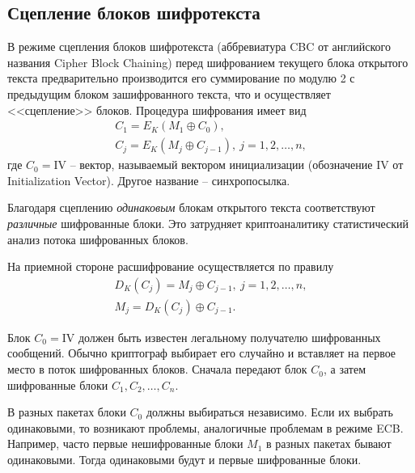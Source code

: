 

\subsection{Сцепление блоков шифротекста}

В режиме сцепления блоков шифротекста (аббревиатура CBC от английского названия Cipher Block Chaining) перед шифрованием текущего блока открытого текста предварительно производится его суммирование по модулю 2 с предыдущим блоком зашифрованного текста, что и осуществляет <<сцепление>> блоков. Процедура шифрования имеет вид
\[ \begin{array}{l}
    C_1 = E_K(M_1 \oplus C_0), \\
    C_j = E_K(M_j \oplus C_{j-1}), ~ j = 1, 2, \dots,  n,
\end{array} \]
где $C_0 = \textrm{IV}$ --  вектор, называемый вектором инициализации (обозначение $\textrm{IV}$ от Initialization Vector). Другое название -- синхропосылка.

Благодаря сцеплению \emph{одинаковым} блокам открытого текста соответствуют \emph{различные} шифрованные блоки. Это затрудняет криптоаналитику статистический анализ потока шифрованных блоков.

На приемной стороне расшифрование осуществляется по правилу
\[ \begin{array}{l}
    D_K(C_j) = M_j \oplus C_{j-1}, ~ j=1, 2, \dots, n,\\
    M_{j} = D_K(C_j) \oplus C_{j-1}.
\end{array} \]

Блок $C_0 = \textrm{IV}$ должен быть известен легальному получателю шифрованных сообщений. Обычно криптограф выбирает его случайно и вставляет на первое место в поток шифрованных блоков. Сначала передают блок $C_0$, а затем шифрованные блоки $C_1, C_2, \ldots, C_n$.

В разных пакетах блоки $C_0$ должны выбираться независимо. Если их выбрать одинаковыми, то возникают проблемы, аналогичные проблемам в режиме ECB. Например, часто первые нешифрованные блоки $M_1$ в разных пакетах бывают одинаковыми. Тогда одинаковыми будут и первые шифрованные блоки.

